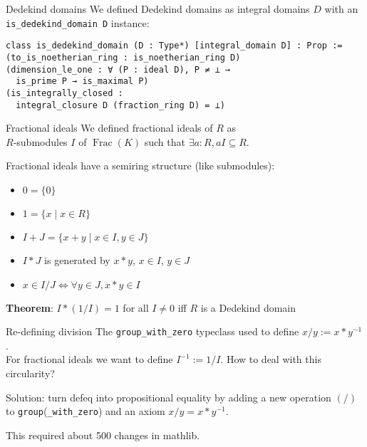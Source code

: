 \documentclass{beamer}
\newcommand{\lean}[1]{\texttt{#1}\xspace}
\newcommand{\mathlib}{\textsf{mathlib}\xspace}
\DeclareMathOperator{\Frac}{Frac}
\begin{document}
\begin{frame}[fragile]{Dedekind domains}
	We defined Dedekind domains as integral domains $D$ with an \lean{is\_dedekind\_domain D} instance:
\begin{lstlisting}
class is_dedekind_domain (D : Type*) [integral_domain D] : Prop :=
(to_is_noetherian_ring : is_noetherian_ring D)
(dimension_le_one : ∀ (P : ideal D), P ≠ ⊥ →
  is_prime P → is_maximal P)
(is_integrally_closed :
  integral_closure D (fraction_ring D) = ⊥)
\end{lstlisting}

\end{frame}

\begin{frame}{Fractional ideals}
	We defined fractional ideals of $R$ as\\
	$R$-submodules $I$ of $\Frac(K)$ such that $\exists a : R, a I \subseteq R$.

	Fractional ideals have a semiring structure (like submodules):\\
	\begin{itemize}
		\item $0 = \{0\}$
		\item $1 = \{x \mid x \in R\}$
		\item $I + J = \{x + y \mid x \in I, y \in J\}$
		\item $I * J$ is generated by $x * y$, $x \in I$, $y \in J$
		\item $x \in I / J \iff \forall y \in J, x * y \in I$
	\end{itemize}

\pause
	\textbf{Theorem}: $I * (1 / I) = 1$ for all $I \ne 0$ iff $R$ is a Dedekind domain
\end{frame}

\begin{frame}{Re-defining division}
	The \lean{group\_with\_zero} typeclass used to define $x / y := x * y^{-1}$.\\
	For fractional ideals we want to define $I^{-1} := 1 / I$.
	How to deal with this circularity?

	\pause
	Solution: turn defeq into propositional equality by
	adding a new operation $(/)$ to \lean{group}(\lean{\_with\_zero})
	and an axiom $x / y = x * y^{-1}$.

	This required about 500 changes in \mathlib.
\end{frame}
\end{document}
